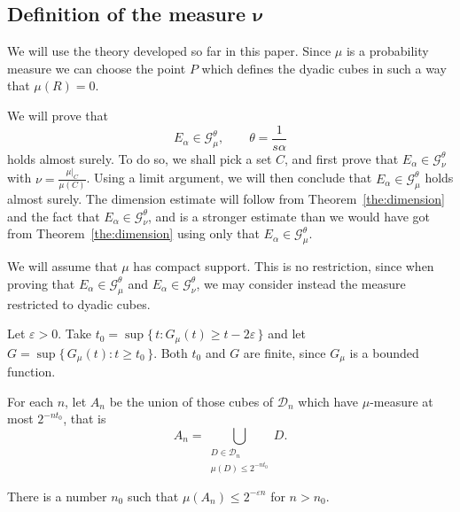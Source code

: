 \documentclass[AHL,Unicode,longabstracts]{cedram}
\begin{document}
\subsection{Definition of the measure \texorpdfstring{$\boldsymbol{\nu}$}{}}

We will use the theory developed so far in this paper. Since $\mu$ is a probability measure we can choose the point $P$ which defines the dyadic cubes in such a way that $\mu (R) = 0$.

We will prove that
\begin{equation*}
E_\alpha \in \mathscr{G}_\mu^\theta, \qquad \theta = \frac{1}{s
\alpha}
\end{equation*}
holds almost surely. To do so, we shall pick a set $C$, and first prove that $E_\alpha \in \mathscr{G}_\nu^\theta$ with $\nu =
\frac{\mu|_C}{\mu (C)}$. Using a limit argument, we will then conclude that $E_\alpha \in \mathscr{G}_\mu^\theta$ holds almost surely. The dimension estimate will follow from Theorem~\ref{the:dimension} and the fact that $E_\alpha \in \mathscr{G}_\nu^\theta$, and is a stronger estimate than we would have got from Theorem~\ref{the:dimension} using only that $E_\alpha \in \mathscr{G}_\mu^\theta$.

We will assume that $\mu$ has compact support. This is no restriction, since when proving that $E_\alpha \in \mathscr{G}_\mu^\theta$ and $E_\alpha \in \mathscr{G}_\nu^\theta$, we may consider instead the measure restricted to dyadic cubes.

Let $\varepsilon > 0$. Take $t_0 = \sup \{\, t : G_\mu (t) \geq t - 2
\varepsilon \,\}$ and let $G = \sup \{\, G_\mu (t) : t \geq t_0
\,\}$. Both $t_0$ and $G$ are finite, since $G_\mu$ is a bounded function.

For each $n$, let $A_n$ be the union of those cubes of $\mathscr{D}_n$ which have $\mu$-measure at most $2^{- n t_0}$, that is
\[
A_n = \bigcup_{\substack{D \in \mathscr{D}_n \\ \mu (D) \leq 2^{-n t_0}}} D.
\]

\begin{lemm}\label{lem:t0}
There is a number $n_0$ such that $\mu (A_n) \leq 2^{- \varepsilon n}$ for $n > n_0$.
\end{lemm}
\end{document}
